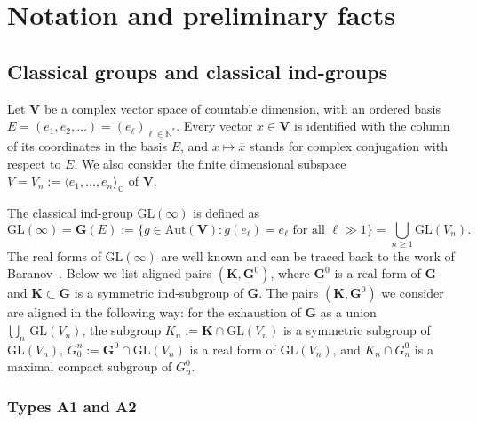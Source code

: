 \documentclass{amsart}
\theoremstyle{definition}
\newcommand{\NN}{\mathbb{N}^*}
\begin{document}
\section{Notation and preliminary facts}

\label{S2}



\subsection{Classical groups and classical ind-groups}

\label{S2.1}

Let $\mathbf{V}$ be a complex vector space of countable dimension, with an ordered basis
$E=(e_1,e_2,\ldots)=(e_\ell)_{\ell\in \NN}$.  
Every vector $x\in\mathbf{V}$ is identified with the column of its coordinates in the basis $E$,
and $x\mapsto \overline{x}$ stands for complex conjugation with respect to $E$. 
We also consider the finite dimensional subspace $V=V_n:=\langle e_1,\ldots,e_n\rangle_\mathbb{C}$ of $\mathbf{V}$.

The classical ind-group $\mathrm{GL}(\infty)$ is defined as
\[\mathrm{GL}(\infty)=\mathbf{G}(E):=\{g\in\mathrm{Aut}(\mathbf{V}):g(e_\ell)=e_\ell\mbox{ for all $\ell\gg 1$}\}=\bigcup_{n\geq 1}\mathrm{GL}(V_n).\]
%
The real forms of $\mathrm{GL}(\infty)$ are well known and can be traced back to the work of Baranov~\cite{Baranov}.  Below we list aligned pairs $(\mathbf{K},\mathbf{G}^0)$, where $\textbf{G}^0$ is a real form of $\mathbf{G}$ and $\mathbf{K}\subset\mathbf{G}$ is a symmetric ind-subgroup of $\mathbf{G}$.  The pairs $\left(\mathbf{K},\mathbf{G}^0\right)$ we consider are aligned in the following way: for the exhaustion of $\mathbf{G}$ as a union $\bigcup_n\,\mathrm{GL}\left(V_n\right)$, the subgroup $K_n:=\mathbf{K}\cap\mathrm{GL}\left(V_n\right)$ is a symmetric subgroup of $\mathrm{GL}\left(V_n\right)$, $G_0^n:=\mathbf{G}^0\cap\mathrm{GL}\left(V_n\right)$ is a real form of $\mathrm{GL}\left(V_n\right)$, and $K_n\cap G_n^0$ is a maximal compact subgroup of $G_n^0$.

\subsubsection{Types A1 and A2}
\label{S:A1A2}
\end{document}
